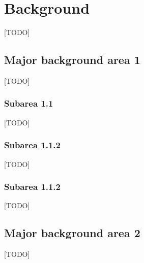 \chapter{Background} \label{ch:background}



[TODO]

\section{Major background area 1}
[TODO]

\subsection{Subarea 1.1}
[TODO]

\subsection{Subarea 1.1.2}
[TODO]

\subsection{Subarea 1.1.2}
[TODO]

\section{Major background area 2}
[TODO]

